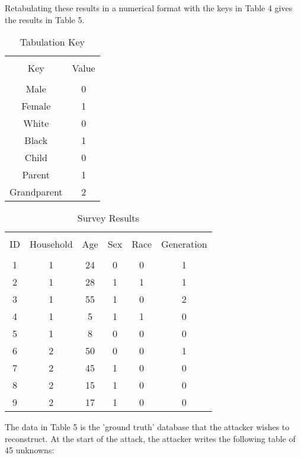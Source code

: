 \documentclass[jou,apacite]{apa6}
\begin{document}
Retabulating these results in a numerical format with the keys in Table 4 gives the results in Table 5.

\begin{table}[!htb]
\caption{Tabulation Key}\label{tab4}
\begin{tabular}{c|c}
\hline\\[-1.5ex]
Key & Value \\[0.5ex]
\hline\\[-1.5ex]
Male & 0 \\[0.5ex]
Female & 1 \\[0.5ex]
White & 0 \\[0.5ex]
Black & 1 \\[0.5ex]
Child & 0 \\[0.5ex]
Parent & 1 \\[0.5ex]
Grandparent & 2 \\[0.5ex]
\hline
\end{tabular}
\end{table}

\begin{table}[!htb]
\caption{Survey Results}\label{tab5}
\begin{tabular}{c|c|c|c|c|c}
\hline\\[-1.5ex]
ID & Household & Age & Sex & Race & Generation \\[0.5ex]
\hline\\[-1.5ex]
1 & 1 & 24 & 0 & 0 & 1  \\[0.5ex]
2 & 1 & 28 & 1 & 1 & 1  \\[0.5ex]
3 & 1 & 55 & 1 & 0 & 2  \\[0.5ex]
4 & 1 & 5 & 1 & 1 & 0  \\[0.5ex]
5 & 1 & 8 & 0 & 0 & 0  \\[0.5ex]
6 & 2 & 50 & 0 & 0 & 1  \\[0.5ex]
7 & 2 & 45 & 1 & 0 & 0  \\[0.5ex]
8 & 2 & 15 & 1 & 0 & 0  \\[0.5ex]
9 & 2 & 17 & 1 & 0 & 0 \\[0.5ex]
\hline
\end{tabular}
\end{table}


The data in Table 5 is the 'ground truth' database that the attacker wishes to reconstruct. At the start of the attack, the attacker writes the following table of 45 unknowns:
\end{document}

